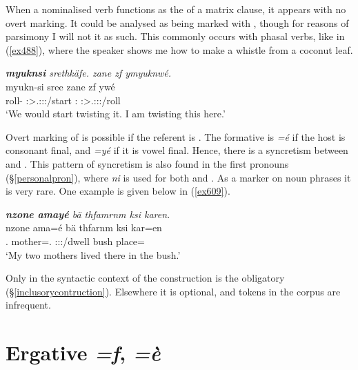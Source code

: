 When a nominalised verb functions as the  of a matrix clause, it appears with no overt  marking. It could be analysed as being marked with  , though for reasons of parsimony I will not  it as such. This commonly occurs with phasal verbs, like in (\ref{ex488}), where the speaker shows me how to make a whistle from a coconut leaf.

\begin{exe}
	\ex \emph{\textbf{myuknsi} srethkäfe. zane zf ymyuknwé.}\\
	\gll myukn-si sree zane zf ywé\\
	roll-\Nmlz{} \Fpl:\Sbj>\Tsg.\Masc:\Obj:\Irr:\Pfv/start \Dem:\Prox{} \Imm{} \Fsg:\Sbj>\Tsg.\Masc:\Obj:\Nonpast:\Ipfv/roll\\
	\trans `We would start twisting it. I am twisting this here.'
	\label{ex488}
\end{exe}

Overt marking of   is possible if the referent is . The formative is \emph{=é} if the host is consonant final, and \emph{=yé} if it is vowel final. Hence, there is a syncretism between  and  . This pattern of syncretism is also found in the first  pronouns (\S{}\ref{personalpron}), where \emph{ni} is used for both  and  . As a  marker on  noun phrases it is very rare. One example is given below in (\ref{ex609}).

\begin{exe}
	\ex \emph{\textbf{nzone amayé} bä thfamrnm ksi karen.}\\
	\gll nzone ama=é bä thfarnm ksi kar=en\\
	\Fsg.\Poss{} mother=\Abs.\Nsg{} \Med{} \Stdu:\Sbj:\Pst:\Dur/dwell bush place=\Loc\\
	\trans `My two mothers lived there in the bush.'
	\label{ex609}
\end{exe}
	
Only in the syntactic context of the  construction is the   obligatory (\S{}\ref{inclusorycontruction}). Elsewhere it is optional, and tokens in the corpus are infrequent.
	
\section{Ergative \emph{=f}, \emph{=è}}\label{ergcase}

